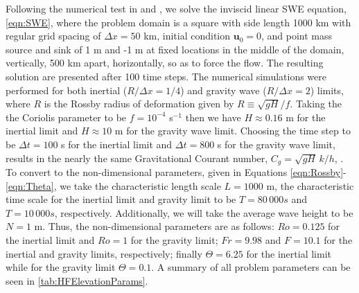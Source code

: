   Following the numerical test in \cite{Hanert2002} and \cite{Batteen1981}, we
  solve the inviscid linear SWE equation, \eqref{eqn:SWE}, where the problem
  domain is a square with side length 1000 km with regular grid spacing of
  $\Delta x=50$ km, initial condition $\mathbf{u}_0 = 0$, and point mass source and
  sink of 1 m and -1 m at fixed locations in the middle of the domain,
  vertically, 500 km apart, horizontally, so as to force the flow.  The
  resulting solution are presented after 100 time steps. The numerical
  simulations were performed for both inertial ($R/\Delta x = 1/4$) and gravity wave
  ($R/\Delta x = 2$) limits, where $R$ is the Rossby radius of deformation given by $R
  \equiv \sqrt{gH}/f$. Taking the the Coriolis parameter to be $f = 10^{-4}$
  s$^{-1}$ then we have $H \approx 0.16$ m for the inertial limit and $H \approx
  10$ m for the gravity wave limit. Choosing the time step to be $\Delta t = 100$ s for the inertial limit
  and $\Delta t = 800$ s for the gravity wave limit, results in the nearly the same
  Gravitational Courant number, $C_g = \sqrt{gH}\,k/h$, \cite{Le-Roux1998}. To
  convert to the non-dimensional parameters, given in Equations
  \ref{eqn:Rossby}-\ref{eqn:Theta}, we take the characteristic length scale $L =
  1000$ m, the characteristic time scale for the inertial limit and gravity
  limit to be $T=80\,000s$ and $T=10\,000s$, respectively. Additionally, we will
  take the average wave height to be $N=1$ m. Thus, the non-dimensional
  parameters are as follows: $Ro = 0.125$ for the inertial limit and $Ro=1$ for
  the gravity limit; $Fr = 9.98$ and $F = 10.1$ for the inertial and gravity
  limits, respectively; finally $\Theta = 6.25$ for the inertial limit while for
  the gravity limit $\Theta = 0.1$. A summary of all problem parameters can be
  seen in \autoref{tab:HFElevationParams}.

